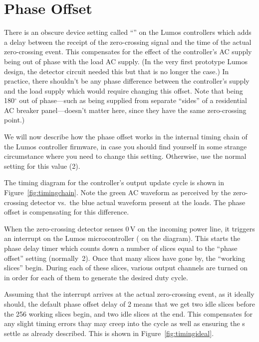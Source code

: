 \documentclass[letterpaper,twoside,onecolumn,openright,final]{memoir}
\begin{document}
\section{Phase Offset}
There is an obscure device setting called ``'' on the Lumos controllers which adds a
delay between the receipt of the zero-crossing signal and the time of the actual zero-crossing
event.  This compensates for the effect of the controller's AC supply being out of phase with the
load AC supply.  (In the very first prototype Lumos design, the detector circuit needed this but
that is no longer the case.)  
In practice, there shouldn't be any phase difference between the controller's
supply and the load supply which would require changing this offset.  Note that being 180$^\circ$
out of phase---such as being supplied from separate ``sides'' of a residential AC breaker panel---doesn't 
matter here, since they have the same zero-crossing point.)

We will now describe how the phase offset works in the internal timing chain of the Lumos
controller firmware, in case you should find yourself in some strange circumstance where you need
to change this setting.  Otherwise, use the normal setting for this value (2).

The timing diagram for the controller's output update cycle is shown in Figure~\ref{fig:timingchain}.
Note the green AC waveform as perceived by the zero-crossing detector vs.\ the blue actual waveform
present at the loads.  The phase offset is compensating for this difference.


When the zero-crossing detector senses 0\,V on the incoming power line, it triggers an interrupt
on the Lumos microcontroller ( on the diagram).  This starts the phase delay timer which
counts down a number of slices equal to the ``phase offset'' setting (normally~2).  Once that many
slices have gone by, the ``working slices'' begin.  During each of these slices, various output
channels are turned on in order for each of them to generate the desired 
duty cycle.

Assuming that the interrupt arrives at the actual zero-crossing event, as it ideally should,
the default phase offset delay of 2 means that we get two
idle slices before the 256 working slices begin, and two idle slices at the end.  This compensates for
any slight timing errors thay may creep into the cycle as well as ensuring the s 
settle as already described.  This is shown in Figure~\ref{fig:timingideal}.

\end{document}
